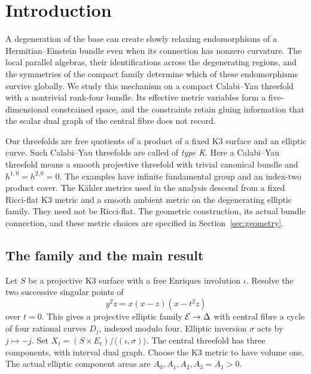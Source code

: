 \section{Introduction}\label{sec:introduction}

A degeneration of the base can create slowly relaxing endomorphisms of a
Hermitian--Einstein bundle even when its connection has nonzero curvature.
The local parallel algebras, their identifications across the degenerating
regions, and the symmetries of the compact family determine which of these
endomorphisms survive globally. We study this mechanism on a compact
Calabi--Yau threefold with a nontrivial rank-four bundle. Its effective metric
variables form a five-dimensional constrained space, and the constraints
retain gluing information that the scalar dual graph of the central fibre
does not record.

Our threefolds are free quotients of a product of a fixed K3 surface and
an elliptic curve. Such Calabi--Yau threefolds are called of \emph{type K}.
Here a Calabi--Yau threefold means a smooth projective threefold with
trivial canonical bundle and $h^{1,0}=h^{2,0}=0$. The examples have infinite
fundamental group and an index-two product cover. The K\"ahler metrics used
in the analysis descend from a fixed Ricci-flat K3 metric and a smooth
ambient metric on the degenerating elliptic family. They need not be
Ricci-flat. The geometric construction, its actual bundle connection,
and these metric choices are specified in Section~\ref{sec:geometry}.

\subsection{The family and the main result}
Let $S$ be a projective K3 surface with a free Enriques involution
$\iota$. Resolve the two successive singular points of
\[
 y^2z=x(x-z)(x-t^2z)
\]
over $t=0$. This gives a projective elliptic family $\mathcal E\to\Delta$
with central fibre a cycle of four rational curves $D_j$, indexed
modulo four. Elliptic inversion $\sigma$ acts by $j\mapsto-j$.
Set $X_t=(S\times E_t)/\langle(\iota,\sigma)\rangle$.
The central threefold has three components, with interval dual graph.
Choose the K3 metric to have volume one. The actual elliptic
component areas are $A_0,A_1,A_2,A_3=A_1>0$.

